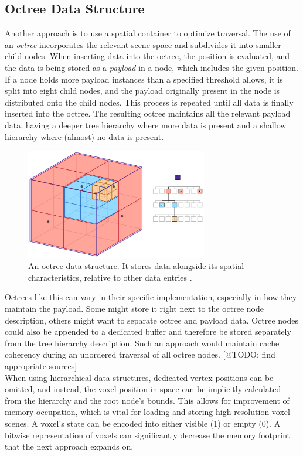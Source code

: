 \subsection*{Octree Data Structure} \label{subsec-octree-data-structure}

Another approach is to use a spatial container to optimize traversal. The use of an \emph{octree} 
incorporates the relevant scene space and subdivides it into smaller child nodes. When inserting data 
into the octree, the position is evaluated, and the data is being stored as a \emph{payload} in 
a node, which includes the given position. If a node holds more payload instances than a specified threshold 
allows, it is split into eight child nodes, and the payload originally present in the node is 
distributed onto the child nodes. This process is repeated until all data is finally inserted 
into the octree. The resulting octree maintains all the relevant payload data, having a deeper tree 
hierarchy where more data is present and a shallow hierarchy where (almost) no data is present.

\begin{figure}[h]
    \centering
    \includegraphics[width=300px]{images/graphics/octree.jpg}
    \caption{An octree data structure. It stores data alongside its spatial characteristics, relative to 
    other data entries \cite{Six2021}.}
    \label{fig:octree}
\end{figure}

\noindent
Octrees like this can vary in their specific implementation, especially in how they maintain the 
payload. Some might store it right next to the octree node description, others might want to separate 
octree and payload data. Octree nodes could also be appended to a dedicated buffer and therefore be stored 
separately from the tree hierarchy description. Such an approach would maintain cache coherency during an 
unordered traversal of all octree nodes. [@TODO: find appropriate sources]\\

\noindent
When using hierarchical data structures, dedicated vertex positions can be omitted, and instead, 
the voxel position in space can be implicitly calculated from the hierarchy and the root node's bounds. 
This allows for improvement of memory occupation, which is vital for loading and storing high-resolution 
voxel scenes. A voxel's state can be encoded into either visible (1) or empty (0). A bitwise representation 
of voxels can significantly decrease the memory footprint that the next approach expands on.


